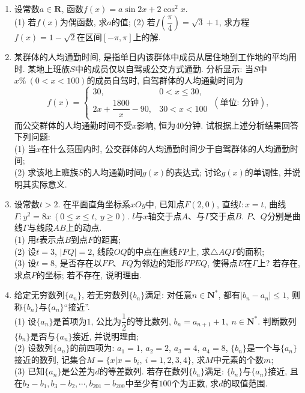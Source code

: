\documentclass[10pt,a4paper]{article}
\begin{document}
\begin{enumerate}[1.]
\begin{center}
\begin{tikzpicture}
    \end{tikzpicture}
\end{center}
\item 设常数$a\in \mathbf{R}$, 函数$f(x)=a\sin 2x+2 \cos^2 x$.\\
(1) 若$f(x)$为偶函数, 求$a$的值;
(2) 若$f\left(\dfrac{\pi}{4}\right)=\sqrt{3}+1$, 求方程$f(x)=1-\sqrt{2}$在区间$[-\pi,\pi]$上的解.
\item 某群体的人均通勤时间, 是指单日内该群体中成员从居住地到工作地的平均用时. 某地上班族$S$中的成员仅以自驾或公交方式通勤. 分析显示: 当$S$中$x\% \ (0<x<100)$的成员自驾时, 自驾群体的人均通勤时间为
$$f(x)=\begin{cases}
30, & 0<x \le 30,\\ 2x+\dfrac{1800}{x}-90, & 30<x<100\end{cases} \ (\text{单位: 分钟}),$$
而公交群体的人均通勤时间不受$x$影响, 恒为$40$分钟. 试根据上述分析结果回答下列问题:\\
(1) 当$x$在什么范围内时, 公交群体的人均通勤时间少于自驾群体的人均通勤时间;\\
(2) 求该地上班族$S$的人均通勤时间$g(x)$的表达式; 讨论$g(x)$的单调性, 并说明其实际意义.
\item 设常数$t>2$. 在平面直角坐标系$xOy$中, 已知点$F(2,0)$, 直线$l:x=t$, 曲线$\Gamma:y^2=8x \ (0\le x\le t, \ y\ge 0)$. $l$与$x$轴交于点$A$、与$\Gamma$交于点$B$. $P$、$Q$分别是曲线$\Gamma$与线段$AB$上的动点.\\
(1) 用$t$表示点$B$到点$F$的距离;\\
(2) 设$t=3$, $|FQ|=2$, 线段$OQ$的中点在直线$FP$上, 求$\triangle AQP$的面积;\\
(3) 设$t=8$, 是否存在以$FP$、$FQ$为邻边的矩形$FPEQ$, 使得点$E$在$\Gamma$上? 若存在, 求点$P$的坐标; 若不存在, 说明理由.
\item 给定无穷数列$\{a_n\}$, 若无穷数列$\{b_n\}$满足: 对任意$n\in \mathbf{N}^*$, 都有$|b_n-a_n|\le 1$, 则称$\{b_n\}$与$\{a_n\}$``接近''.\\
(1) 设$\{a_n\}$是首项为$1$, 公比为$\dfrac{1}{2}$的等比数列, $b_n=a_{n+1}+1, \ n\in \mathbf{N}^*$. 判断数列$\{b_n\}$是否与$\{a_n\}$接近, 并说明理由;\\
(2) 设数列$\{a_n\}$的前四项为: $a_1=1$, $a_2=2$, $a_3=4$, $a_4=8$, $\{b_n\}$是一个与$\{a_n\}$接近的数列, 记集合$M=\{x|x=b_i, \ i=1,2,3,4\}$, 求$M$中元素的个数$m$;\\
(3) 已知$\{a_n\}$是公差为$d$的等差数列. 若存在数列$\{b_n\}$满足: $\{b_n\}$与$\{a_n\}$接近, 且在$b_2-b_1,b_3-b_2,\cdots,b_{201}-b_{200}$中至少有$100$个为正数, 求$d$的取值范围.
\end{enumerate}
\end{document}
